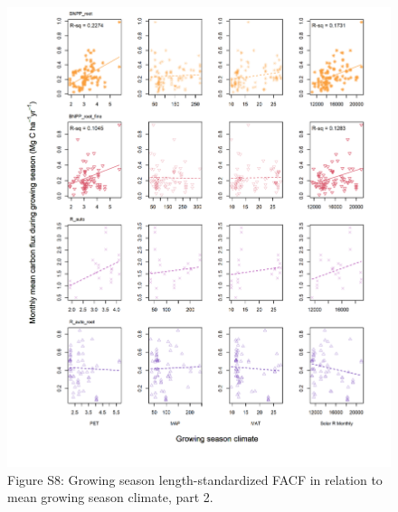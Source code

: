 \documentclass[]{article}
\begin{document}
\begin{figure}[H]
\includegraphics[width=1\linewidth]{tables_figures/gridded_growing_season2} \caption{Figure S8: Growing season length-standardized FACF in relation to mean growing season climate, part 2.}\label{fig:unnamed-chunk-14}
\end{figure}

\newpage
\end{document}
